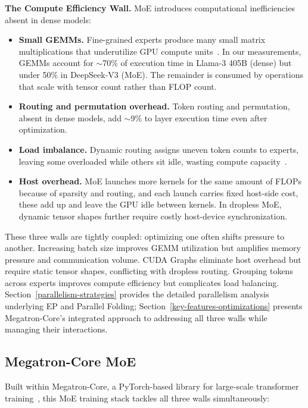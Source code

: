\documentclass[10pt,logo,copyright]{nvidiatechreport}
\begin{document}
\textbf{The Compute Efficiency Wall.} MoE introduces computational inefficiencies absent in dense models:
\begin{itemize}[nosep,leftmargin=*]
    \item \textbf{Small GEMMs.} Fine-grained experts produce many small matrix multiplications that underutilize GPU compute units~\cite{megablocks}. In our measurements, GEMMs account for $\sim$70\% of execution time in Llama-3 405B (dense) but under 50\% in DeepSeek-V3 (MoE). The remainder is consumed by operations that scale with tensor count rather than FLOP count.
    \item \textbf{Routing and permutation overhead.} Token routing and permutation, absent in dense models, add $\sim$9\% to layer execution time even after optimization.
    \item \textbf{Load imbalance.} Dynamic routing assigns uneven token counts to experts, leaving some overloaded while others sit idle, wasting compute capacity~\cite{wang2024auxiliarylossfreeloadbalancingstrategy}.
    \item \textbf{Host overhead.} MoE launches more kernels for the same amount of FLOPs because of sparsity and routing, and each launch carries fixed host-side cost, these add up and leave the GPU idle between kernels. In dropless MoE, dynamic tensor shapes further require costly host-device synchronization.
\end{itemize}

These three walls are tightly coupled: optimizing one often shifts pressure to another. Increasing batch size improves GEMM utilization but amplifies memory pressure and communication volume. CUDA Graphs eliminate host overhead but require static tensor shapes, conflicting with dropless routing. Grouping tokens across experts improves compute efficiency but complicates load balancing. Section~\ref{parallelism-strategies} provides the detailed parallelism analysis underlying EP and Parallel Folding; Section~\ref{key-features-optimizations} presents Megatron-Core's integrated approach to addressing all three walls while managing their interactions.


\subsection{Megatron-Core MoE}
Built within Megatron-Core, a PyTorch-based library for large-scale transformer training~\cite{shoeybi2020megatronlmtrainingmultibillionparameter,paszke2019pytorchimperativestylehighperformance}, this MoE training stack tackles all three walls simultaneously:
\end{document}
